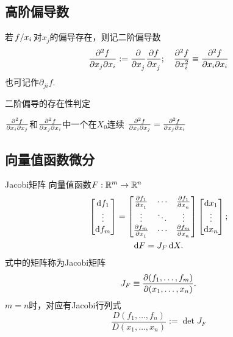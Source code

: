 \subsection{高阶偏导数}
\begin{definition}{}{}
	若$\left.f\middle\slash x_i\right.$对$x_j$的偏导存在，则记二阶偏导数
	\[
		\pw f{x_j}{x_i}:=\pp{x_j}\pv f{x_j};\quad \pu2 f{x_i}\equiv\pw f{x_i}{x_i}
	\]
	也可记作$\partial_{ji}f.$
\end{definition}
\begin{theorem}{二阶偏导的存在性判定}{}
	\begin{center}
		$\frac{\partial^2 f}{\partial x_i\partial x_j}$和$\frac{\partial^2 f}{\partial x_j\partial x_i}$中一个在$X_0$连续
		\vthus
		$\frac{\partial^2 f}{\partial x_i\partial x_j}=\frac{\partial^2 f}{\partial x_j\partial x_i}$
	\end{center}
\end{theorem}
\subsection{向量值函数微分}
\begin{definition}{Jacobi矩阵}{}
	向量值函数$F:\mathbb R^m\to\mathbb R^n$%
	\begin{gather*}
		\begin{bmatrix}
			\text df_1 \\
			\vdots     \\
			\text df_m
		\end{bmatrix}=
		\begin{bmatrix}
			\pv{f_1}{x_1} & \cdots & \pv{f_1}{x_n} \\
			\vdots                & \ddots & \vdots                \\
			\pv{f_m}{x_1} & \cdots & \pv{f_m}{x_n}
		\end{bmatrix}
		\begin{bmatrix}
			\d x_1 \\
			\vdots \\
			\d x_n
		\end{bmatrix};\\
		\d F=J_F\d X.
	\end{gather*}
	式中的矩阵称为Jacobi矩阵
	\[
		J_F\equiv\frac{\partial(f_1,\ldots,f_m)}{\partial(x_1,\ldots,x_n)}.
	\]
	$m=n$时，对应有Jacobi行列式
	\[
		\frac{D(f_1,\ldots,f_n)}{D(x_1,\ldots,x_n)}:=\det J_F
	\]
\end{definition}
